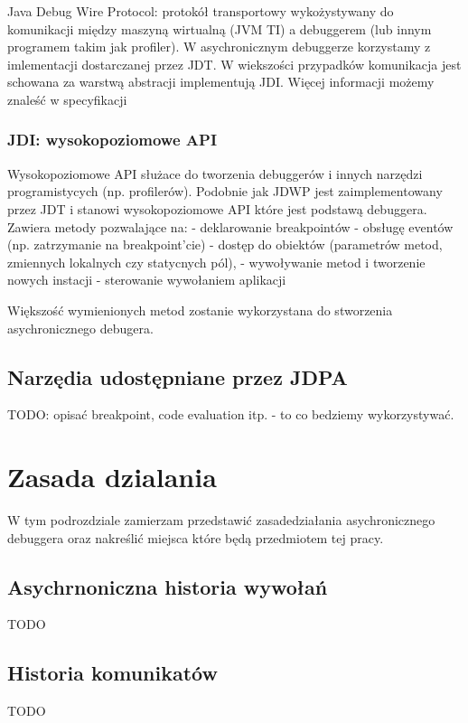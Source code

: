 Java Debug Wire Protocol: protokół transportowy wykożystywany do komunikacji między maszyną wirtualną (JVM TI) a debuggerem (lub innym programem takim jak profiler). W asychronicznym debuggerze korzystamy z imlementacji dostarczanej przez JDT. W wiekszości przypadków komunikacja jest schowana za warstwą abstracji implementują JDI. Więcej informacji możemy znaleść w specyfikacji\cite{jwdpSpec}

\subsubsection{JDI: wysokopoziomowe API}

Wysokopoziomowe API służace do tworzenia debuggerów i innych narzędzi programistycych (np. profilerów). Podobnie jak JDWP jest zaimplementowany przez JDT i stanowi wysokopoziomowe API które jest podstawą debuggera.
Zawiera metody pozwalające na:
- deklarowanie breakpointów
- obsługę eventów (np. zatrzymanie na breakpoint'cie)
- dostęp do obiektów (parametrów metod, zmiennych lokalnych czy statycnych pól),
- wywoływanie metod i tworzenie nowych instacji
- sterowanie wywołaniem aplikacji

Większość wymienionych metod zostanie wykorzystana do stworzenia asychronicznego debugera.



\subsection{Narzędia udostępniane przez JDPA}

TODO: opisać breakpoint, code evaluation itp. - to co bedziemy wykorzystywać.



\section{Zasada dzialania}

W tym podrozdziale zamierzam przedstawić zasadedziałania asychronicznego debuggera oraz nakreślić  miejsca które będą przedmiotem tej pracy.

\subsection{Asychrnoniczna historia wywołań}
TODO
\subsection{Historia komunikatów}
TODO
